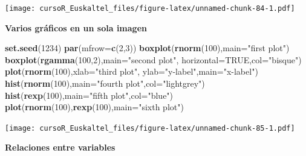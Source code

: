 \documentclass[]{book}
\newenvironment{Shaded}{\begin{snugshade}}{\end{snugshade}}
\newcommand{\KeywordTok}[1]{\textcolor[rgb]{0.13,0.29,0.53}{\textbf{#1}}}
\newcommand{\DataTypeTok}[1]{\textcolor[rgb]{0.13,0.29,0.53}{#1}}
\newcommand{\DecValTok}[1]{\textcolor[rgb]{0.00,0.00,0.81}{#1}}
\newcommand{\StringTok}[1]{\textcolor[rgb]{0.31,0.60,0.02}{#1}}
\newcommand{\OtherTok}[1]{\textcolor[rgb]{0.56,0.35,0.01}{#1}}
\newcommand{\NormalTok}[1]{#1}
\begin{document}
\texttt{[image: cursoR\_Euskaltel\_files/figure-latex/unnamed-chunk-84-1.pdf]}

\textbf{Varios gráficos en un sola imagen}

\begin{Shaded}
\begin{Highlighting}[]
\KeywordTok{set.seed}\NormalTok{(}\DecValTok{1234}\NormalTok{)}
 \KeywordTok{par}\NormalTok{(}\DataTypeTok{mfrow=}\KeywordTok{c}\NormalTok{(}\DecValTok{2}\NormalTok{,}\DecValTok{3}\NormalTok{))}
 \KeywordTok{boxplot}\NormalTok{(}\KeywordTok{rnorm}\NormalTok{(}\DecValTok{100}\NormalTok{),}\DataTypeTok{main=}\StringTok{"first plot"}\NormalTok{)}
 \KeywordTok{boxplot}\NormalTok{(}\KeywordTok{rgamma}\NormalTok{(}\DecValTok{100}\NormalTok{,}\DecValTok{2}\NormalTok{),}\DataTypeTok{main=}\StringTok{"second plot"}\NormalTok{, }\DataTypeTok{horizontal=}\OtherTok{TRUE}\NormalTok{,}\DataTypeTok{col=}\StringTok{"bisque"}\NormalTok{)}
 \KeywordTok{plot}\NormalTok{(}\KeywordTok{rnorm}\NormalTok{(}\DecValTok{100}\NormalTok{),}\DataTypeTok{xlab=}\StringTok{"third plot"}\NormalTok{,}
      \DataTypeTok{ylab=}\StringTok{"y-label"}\NormalTok{,}\DataTypeTok{main=}\StringTok{"x-label"}\NormalTok{)}
 \KeywordTok{hist}\NormalTok{(}\KeywordTok{rnorm}\NormalTok{(}\DecValTok{100}\NormalTok{),}\DataTypeTok{main=}\StringTok{"fourth plot"}\NormalTok{,}\DataTypeTok{col=}\StringTok{"lightgrey"}\NormalTok{)}
 \KeywordTok{hist}\NormalTok{(}\KeywordTok{rexp}\NormalTok{(}\DecValTok{100}\NormalTok{),}\DataTypeTok{main=}\StringTok{"fifth plot"}\NormalTok{,}\DataTypeTok{col=}\StringTok{"blue"}\NormalTok{)}
 \KeywordTok{plot}\NormalTok{(}\KeywordTok{rnorm}\NormalTok{(}\DecValTok{100}\NormalTok{),}\KeywordTok{rexp}\NormalTok{(}\DecValTok{100}\NormalTok{),}\DataTypeTok{main=}\StringTok{"sixth plot"}\NormalTok{)}
\end{Highlighting}
\end{Shaded}

\texttt{[image: cursoR\_Euskaltel\_files/figure-latex/unnamed-chunk-85-1.pdf]}

\textbf{Relaciones entre variables}
\end{document}
